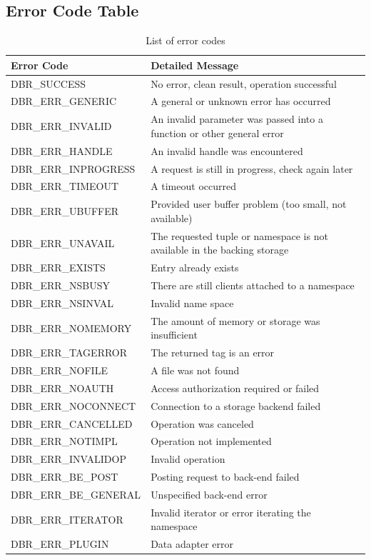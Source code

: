 \subsection{Error Code Table}
\begin {table}[h]
    \scriptsize
\begin{tabular}{l|p{10cm}}
	\toprule
	\textbf{Error Code} & \textbf{Detailed Message} \\
	\toprule
	DBR\_SUCCESS &  No error, clean result, operation successful\\ 
    \midrule
	DBR\_ERR\_GENERIC & A general or unknown error has occurred \\ 
	\midrule
	DBR\_ERR\_INVALID & An invalid parameter was passed into a function or other general error \\ 
	\midrule
	DBR\_ERR\_HANDLE  & An invalid handle was encountered \\
	\midrule
	DBR\_ERR\_INPROGRESS & A request is still in progress, check again later  \\ 
	\midrule
	DBR\_ERR\_TIMEOUT & A timeout occurred  \\ 
	\midrule
	DBR\_ERR\_UBUFFER & Provided user buffer problem (too small, not available)  \\ 
	\midrule
	DBR\_ERR\_UNAVAIL & The requested tuple or namespace is not available in the backing storage \\ 
	\midrule
	DBR\_ERR\_EXISTS & Entry already exists \\ 
	\midrule
	DBR\_ERR\_NSBUSY & There are still clients attached to a namespace \\ 
	\midrule
	DBR\_ERR\_NSINVAL & Invalid name space\\ 
	\midrule
	DBR\_ERR\_NOMEMORY & The amount of memory or storage was insufficient \\ 
	\midrule
	DBR\_ERR\_TAGERROR & The returned tag is an error\\ 
	\midrule
	DBR\_ERR\_NOFILE & A file was not found \\ 
	\midrule
	DBR\_ERR\_NOAUTH & Access authorization required or failed\\ 
	\midrule
	DBR\_ERR\_NOCONNECT & Connection to a storage backend failed  \\ 
	\midrule
	DBR\_ERR\_CANCELLED & Operation was canceled  \\
	\midrule
	DBR\_ERR\_NOTIMPL & Operation not implemented \\ 
	\midrule
	DBR\_ERR\_INVALIDOP & Invalid operation  \\ 
	\midrule
	 DBR\_ERR\_BE\_POST & Posting request to back-end failed  \\ 
	\midrule
	DBR\_ERR\_BE\_GENERAL & Unspecified back-end error \\ 
    \midrule
    DBR\_ERR\_ITERATOR & Invalid iterator or error iterating the namespace \\
    \midrule
    DBR\_ERR\_PLUGIN & Data adapter error \\
    \bottomrule
\end{tabular} 
\caption {List of error codes} 
\label{table:errorcodes} 
\end{table}

